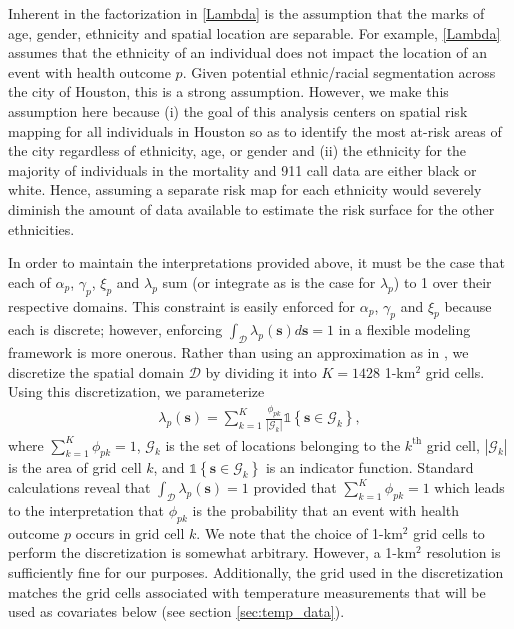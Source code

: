 \documentclass[final]{statsoc}
\begin{document}
Inherent in the factorization in \eqref{Lambda} is the assumption that the marks of 
age, gender, ethnicity and spatial location are separable.  For example, \eqref{Lambda} 
assumes that the ethnicity of an individual does not impact the location of an event 
with health outcome $p$.  Given potential ethnic/racial segmentation across the city 
of Houston, this is a strong assumption.  However, we make this assumption here because 
(i) the goal of this analysis centers on spatial risk mapping for all individuals in 
Houston so as to identify the most at-risk areas of the city regardless of ethnicity, 
age, or gender and (ii) the ethnicity for the majority of individuals in the mortality 
and 911 call data are either black or white.  Hence, assuming a separate risk map for 
each ethnicity would severely diminish the amount of data available to estimate the 
risk surface for the other ethnicities.

In order to maintain the interpretations provided above, it must be the case that each 
of $\alpha_p$, $\gamma_p$, $\xi_p$ and $\lambda_p$ sum (or integrate as is the case for 
$\lambda_p$) to 1 over their respective domains. This constraint is easily 
enforced for $\alpha_p$, $\gamma_p$ and $\xi_p$ because each is discrete;  however, 
enforcing $\int_{\mathcal{D}}\lambda_p(\mathbf{s})d\mathbf{s} = 1$ in a flexible modeling 
framework is more onerous.  Rather than using an approximation as in \cite{Liang2009},
we discretize the spatial domain $\mathcal{D}$ by dividing it into 
$K=1428$ 1-km$^2$ grid cells. Using this discretization, we parameterize
 \begin{align}
 \lambda_p(\mathbf{s}) = \sum_{k=1}^K \frac{\phi_{pk}}{\left| \mathcal{G}_k \right|}
\mathds{1}\left\{\mathbf{s} \in \mathcal{G}_k\right\},
\label{lambda}
\end{align}
where $\sum_{k=1}^{K}\phi_{pk} = 1$, $\mathcal{G}_k$ is the set of locations belonging to the
$k^\text{th}$ grid cell, $\left| \mathcal{G}_k \right|$
is the area of grid cell $k$, and
$\mathds{1}\left\{\mathbf{s} \in \mathcal{G}_k\right\}$ is an indicator function. 
Standard calculations reveal that $\int_{\mathcal{D}}\lambda_p(\mathbf{s}) = 1$ provided 
that $\sum_{k=1}^K\phi_{pk} = 1$ which leads to the interpretation that
$\phi_{pk}$ is the probability that an event with health outcome $p$ occurs in grid cell 
$k$. We note that the choice of 1-km$^2$ grid cells to perform the discretization is somewhat 
arbitrary. However, a 1-km$^2$ resolution is sufficiently fine for our purposes. Additionally, 
the grid used in the discretization matches the grid cells associated with temperature 
measurements that will be used as covariates below (see section \ref{sec:temp_data}). 
\end{document}
